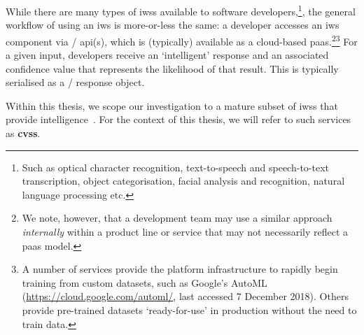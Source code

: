 While there are many types of \glspl{iws} available to software developers,\footnote{Such as optical character recognition, text-to-speech and speech-to-text transcription, object categorisation, facial analysis and recognition, natural language processing etc.}, the general workflow of using an \gls{iws} is more-or-less the same: a developer accesses an \gls{iws} component via / \gls{api}(s), which is (typically) available as a cloud-based \gls{paas}.\footnote{We note, however, that a development team may use a similar approach \textit{internally} within a product line or service that may not necessarily reflect a \gls{paas} model.}\footnote{A number of services provide the platform infrastructure to rapidly begin training from custom datasets, such as Google's AutoML (\url{https://cloud.google.com/automl/}, last accessed 7 December 2018). Others provide pre-trained datasets `ready-for-use' in production without the need to train data.} For a given input, developers receive an `intelligent' response and an associated confidence value that represents the likelihood of that result. This is typically serialised as a / response object. 


\begin{callout}
Within this thesis, we scope our investigation to a mature \textup{subset} of \glspl{iws} that provide  intelligence~. For the context of this thesis, we will refer to such services as \textbf{\glspl{cvs}}. 
\end{callout}



